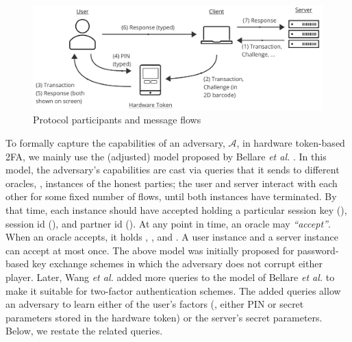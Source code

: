 \begin{figure}
\begin{centering}
\includegraphics[width=12cm]{setup}
\end{centering}
\caption{\label{fig:setup.}Protocol participants and message flows}
\end{figure}
%




To formally capture the capabilities of an adversary, $\mathcal{A}$, in hardware token-based 2FA,  we mainly use the (adjusted) model proposed by Bellare \textit{et al.} \cite{BellarePR00}. In this model, the adversary’s capabilities are cast via queries that it sends to different oracles, \ie, instances of the honest parties; the user and server interact with each other for some fixed number of flows, until both instances have terminated. By that time, each instance should have accepted holding a particular session key (\seckey), session id (\SID), and partner id (\PID). At any point in time, an oracle may \emph{``accept''}. When an oracle accepts, it holds \seckey, \SID, and \PID. A user instance and a server instance can accept at most once. The above model was initially proposed for password-based key exchange schemes in which the adversary does not corrupt either player.  Later, Wang \textit{et al.} \cite{WangW18}  added more queries to the model of  Bellare \textit{et al.} to make it suitable for two-factor authentication schemes. The added queries allow an adversary to learn either of the user's factors (\ie, either PIN or secret parameters stored in the hardware token) or the server's secret parameters.  Below, we restate the related queries. 
 





